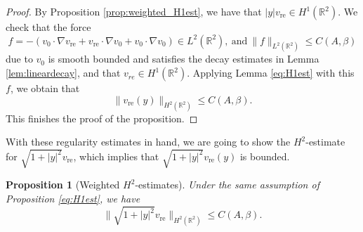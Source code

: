 \documentclass[12pt]{amsart}
\numberwithin{equation}{section}              %
\newtheorem{proposition}{Proposition}[section]
\theoremstyle{remark}
\begin{document}
		\begin{proof}
			By Proposition \ref{prop:weighted_H1est}, we have that 
			$|y|v_{\text{re}} \in H^1(\mathbb{R}^2)$.
			We check that the force
			\begin{equation*}
				f  =-(v_0\cdot \nabla v_{\text{re}} + v_{\text{re}}\cdot \nabla  v_0 + v_0\cdot\nabla  v_0) \in L^2(\mathbb{R}^2), ~ \textrm{and}~\|f\|_{L^2(\mathbb{R}^2)}\leq C(A,\beta)
			\end{equation*}
			due to $v_0$ is smooth bounded and satisfies the decay estimates in  Lemma \ref{lem:lineardecay}, and that $v_{re}\in H^1(\mathbb{R}^2)$.
			Applying Lemma \ref{eq:H1est} 
			with this $f$,  
			we obtain   that 
            \begin{equation*}
				\|v_{\text{re}}(y) \|_{H^2(\mathbb{R}^2)}\leq C(A,\beta).
			\end{equation*}
            This finishes the proof of the proposition.
            \end{proof}
   
		
		
		
		With these regularity estimates in hand, we are going to show the $H^2$-estimate for $\sqrt{1+|y|^2}v_{\text{re}}$, which implies that $\sqrt{1+|y|^2}v_{\text{re}}(y)$ is bounded.
		
		\begin{proposition}[Weighted $H^2$-estimates] \label{propH2est}
            Under the same assumption of Proposition \ref{eq:H1est}, 
			we have 
			\begin{equation}
				\| \sqrt{1+|y|^2}v_{\text{re}}\|_{H^2(\mathbb{R}^2)}\leq C(A,\beta).
			\end{equation}
		\end{proposition}
		
\end{document}
